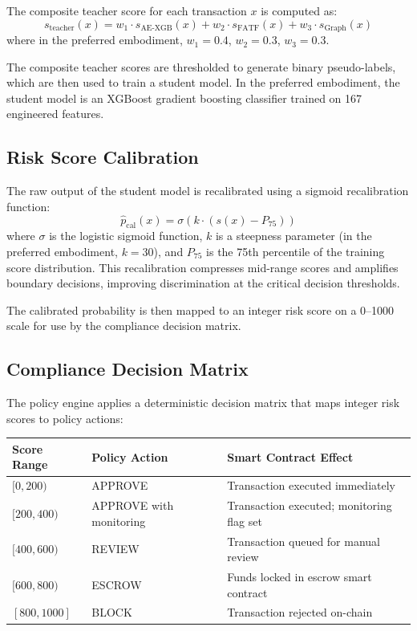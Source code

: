 \documentclass[12pt,a4paper]{article}
\begin{document}
The composite teacher score for each transaction $x$ is computed as:
\begin{equation}
s_{\text{teacher}}(x) = w_1 \cdot s_{\text{AE-XGB}}(x) + w_2 \cdot 
s_{\text{FATF}}(x) + w_3 \cdot s_{\text{Graph}}(x)
\end{equation}
where in the preferred embodiment, $w_1 = 0.4$, $w_2 = 0.3$, $w_3 = 0.3$.

The composite teacher scores are thresholded to generate binary 
pseudo-labels, which are then used to train a student model. In the 
preferred embodiment, the student model is an XGBoost gradient boosting 
classifier trained on 167 engineered features.

\subsection{Risk Score Calibration}

The raw output of the student model is recalibrated using a sigmoid 
recalibration function:
\begin{equation}
\hat{p}_{\text{cal}}(x) = \sigma\left(k \cdot (s(x) - P_{75})\right)
\end{equation}
where $\sigma$ is the logistic sigmoid function, $k$ is a steepness 
parameter (in the preferred embodiment, $k = 30$), and $P_{75}$ is the 75th 
percentile of the training score distribution. This recalibration compresses 
mid-range scores and amplifies boundary decisions, improving discrimination 
at the critical decision thresholds.

The calibrated probability is then mapped to an integer risk score on a 
0--1000 scale for use by the compliance decision matrix.

\subsection{Compliance Decision Matrix}

The policy engine applies a deterministic decision matrix that maps 
integer risk scores to policy actions:

\begin{center}
\begin{tabular}{lll}
\toprule
\textbf{Score Range} & \textbf{Policy Action} & \textbf{Smart Contract Effect} \\
\midrule
$[0, 200)$ & APPROVE & Transaction executed immediately \\
$[200, 400)$ & APPROVE with monitoring & Transaction executed; monitoring flag set \\
$[400, 600)$ & REVIEW & Transaction queued for manual review \\
$[600, 800)$ & ESCROW & Funds locked in escrow smart contract \\
$[800, 1000]$ & BLOCK & Transaction rejected on-chain \\
\bottomrule
\end{tabular}
\end{center}
\end{document}
